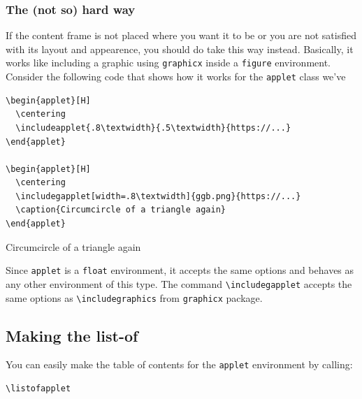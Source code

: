\documentclass[10pt,a4paper]{article}
\begin{document}
\subsubsection{The (not so) hard way}
If the content frame is not placed where you want it to be or you are not satisfied with its layout and appearence, you should do take this way instead. Basically, it works like including a graphic using \verb|graphicx| inside a \verb|figure| environment. Consider the following code that shows how it works for the \verb|applet| class we've 
\begin{lstlisting}[frame=single]
\begin{applet}[H]
  \centering
  \includeapplet{.8\textwidth}{.5\textwidth}{https://...}
\end{applet}

\begin{applet}[H]
  \centering
  \includegapplet[width=.8\textwidth]{ggb.png}{https://...}
  \caption{Circumcircle of a triangle again}
\end{applet}
\end{lstlisting}
\begin{applet}[H]
\centering
{}
\end{applet}
\begin{applet}[H]
\centering
{}
\caption{Circumcircle of a triangle again}
\end{applet}
Since \verb|applet| is a \verb|float| environment, it accepts the same options and behaves as any other environment of this type. The command \verb|\includegapplet| accepts the same options as \verb|\includegraphics| from \verb|graphicx| package.
\subsection{Making the list-of}
You can easily make the table of contents for the \verb|applet| environment by calling:
\begin{lstlisting}[frame=single]
\listofapplet
\end{lstlisting}
\end{document}

